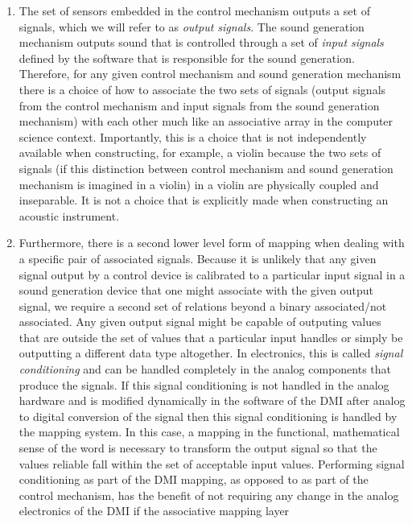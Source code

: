 \begin{enumerate}
\item The set of sensors embedded in the control mechanism outputs a set of signals, which we will refer to as \emph{output signals}. The sound generation mechanism outputs sound that is controlled through a set of \emph{input signals} defined by the software that is responsible for the sound generation. Therefore, for any given control mechanism and sound generation mechanism there is a choice of how to associate the two sets of signals (output signals from the control mechanism and input signals from the sound generation mechanism) with each other much like an associative array in the computer science context. Importantly, this is a choice that is not independently available when constructing, for example, a violin because the two sets of signals (if this distinction between control mechanism and sound generation mechanism is imagined in a violin) in a violin are physically coupled and inseparable. It is not a choice that is explicitly made when constructing an acoustic instrument.

\item Furthermore, there is a second lower level form of mapping when dealing with a specific pair of associated signals. Because it is unlikely that any given signal output by a control device is calibrated to a particular input signal in a sound generation device that one might associate with the given output signal, we require a second set of relations beyond a binary associated/not associated. Any given output signal might be capable of outputing values that are outside the set of values that a particular input handles or simply be outputting a different data type altogether. In electronics, this is called \emph{signal conditioning} and can be handled completely in the analog components that produce the signals. If this signal conditioning is not handled in the analog hardware and is modified dynamically in the software of the DMI after analog to digital conversion of the signal then this signal conditioning is handled by the mapping system. In this case, a mapping in the functional, mathematical sense of the word is necessary to transform the output signal so that the values reliable fall within the set of acceptable input values. Performing signal conditioning as part of the DMI mapping, as opposed to as part of the control mechanism, has the benefit of not requiring any change in the analog electronics of the DMI if the associative mapping layer
\end{enumerate}

